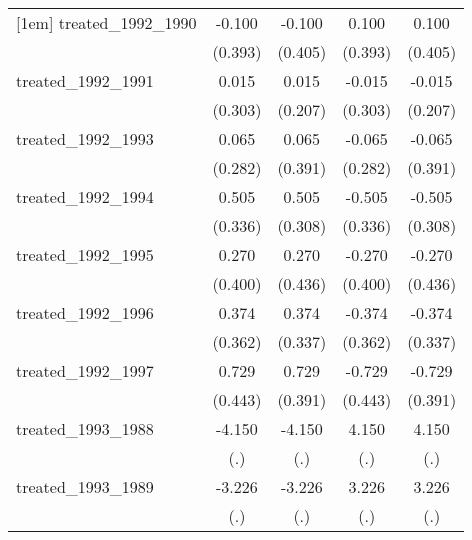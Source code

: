 {\begin{tabular}{l*{4}{c}}
[1em]
treated\_1992\_1990&      -0.100         &      -0.100         &       0.100         &       0.100         \\
            &     (0.393)         &     (0.405)         &     (0.393)         &     (0.405)         \\
[1em]
treated\_1992\_1991&       0.015         &       0.015         &      -0.015         &      -0.015         \\
            &     (0.303)         &     (0.207)         &     (0.303)         &     (0.207)         \\
[1em]
treated\_1992\_1993&       0.065         &       0.065         &      -0.065         &      -0.065         \\
            &     (0.282)         &     (0.391)         &     (0.282)         &     (0.391)         \\
[1em]
treated\_1992\_1994&       0.505         &       0.505         &      -0.505         &      -0.505         \\
            &     (0.336)         &     (0.308)         &     (0.336)         &     (0.308)         \\
[1em]
treated\_1992\_1995&       0.270         &       0.270         &      -0.270         &      -0.270         \\
            &     (0.400)         &     (0.436)         &     (0.400)         &     (0.436)         \\
[1em]
treated\_1992\_1996&       0.374         &       0.374         &      -0.374         &      -0.374         \\
            &     (0.362)         &     (0.337)         &     (0.362)         &     (0.337)         \\
[1em]
treated\_1992\_1997&       0.729         &       0.729         &      -0.729         &      -0.729         \\
            &     (0.443)         &     (0.391)         &     (0.443)         &     (0.391)         \\
[1em]
treated\_1993\_1988&      -4.150         &      -4.150         &       4.150         &       4.150         \\
            &         (.)         &         (.)         &         (.)         &         (.)         \\
[1em]
treated\_1993\_1989&      -3.226         &      -3.226         &       3.226         &       3.226         \\
            &         (.)         &         (.)         &         (.)         &         (.)         \\

\end{tabular}}
